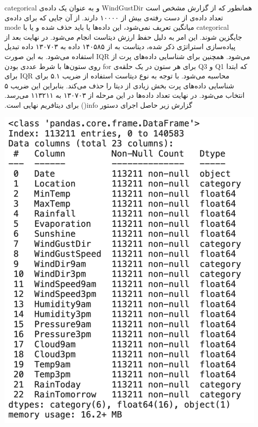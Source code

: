‫همانطور که از گزارش مشخص است WindGustDir و  به عنوان یک داده‌ی categorical تعداد داده‌ی از دست رفته‌ی بیش از ۱۰۰۰۰ دارند. از آن جایی که برای داده‌ی categorical میانگین تعریف نمی‌شود، این داده‌ها یا باید حذف شده و یا با mode جایگزین شوند. این امر به دلیل حفظ ارزش دیتاست انجام می‌شود. \newline
‫در نهایت بعد از پیاده‌سازی استراتژی ذکر شده، دیتاست به از ۱۴۰۵۸۵ داده به ۱۳۰۷۰۳ داده تبدیل می‌شود. \newline
‫همچنین برای شناسایی داده‌های پرت از IQR استفاده می‌شود. به این صورت که ابتدا Q1 و Q3 برای هر ستون در یک حلقه‌ی for روی ستون‌ها با شرط عددی بودن محاسبه می‌شود. با توجه به نوع دیتاست استفاده از ضریب ۵.۱ برای IQR برای شناسایی داده‌های پرت بخش زیادی از دیتا را حذف می‌کند. بنابراین این ضریب ۵ انتخاب می‌شود. در نهایت تعداد داده‌ها در این مرحله از ۱۳۰۷۰۳ به ۱۱۳۲۱۱ می‌رسد. گزارش زیر حاصل اجرای دستور info() برای دیتافریم نهایی است.
‫
‫\begin{center}
‫\includegraphics[scale=0.35]{figs/info3.png}
‫\end{center}
‫